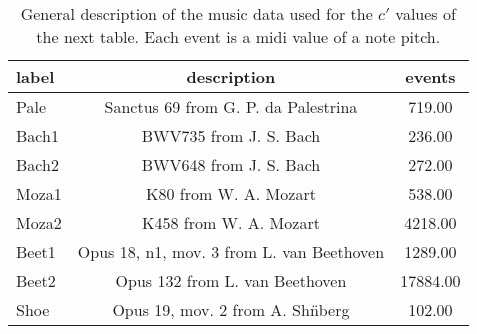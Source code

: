 \begin{table}[h!]
\begin{center}
\begin{tabular}{| l | c | c |}\hline
label & description & events \\\hline
Pale & Sanctus 69 from G. P. da Palestrina  & 719.00 \\\hline
Bach1 & BWV735 from J. S. Bach  & 236.00 \\\hline
Bach2 & BWV648 from J. S. Bach  & 272.00 \\\hline
Moza1 & K80 from W. A. Mozart  & 538.00 \\\hline
Moza2 & K458 from W. A. Mozart  & 4218.00 \\\hline
Beet1 & Opus 18, n1, mov. 3 from L. van Beethoven  & 1289.00 \\\hline
Beet2 & Opus 132 from L. van Beethoven  & 17884.00 \\\hline
Shoe & Opus 19, mov. 2 from A. Sh\"nberg  & 102.00 \\\hline
\end{tabular}
\caption{General description of the music data used for the $c'$ values of the next table. Each event is a midi value of a note pitch.}
\end{center}
\end{table}